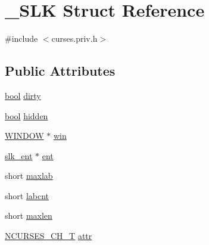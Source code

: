 \hypertarget{struct___s_l_k}{\section{\-\_\-\-S\-L\-K Struct Reference}
\label{struct___s_l_k}
}


{\ttfamily \#include $<$curses.\-priv.\-h$>$}

\subsection*{Public Attributes}
\begin{DoxyCompactItemize}
\item 
\hyperlink{term__entry_8h_a002004ba5d663f149f6c38064926abac}{bool} \hyperlink{struct___s_l_k_ace7f1360b4c1d1304e7a4aa6df2150e9}{dirty}
\item 
\hyperlink{term__entry_8h_a002004ba5d663f149f6c38064926abac}{bool} \hyperlink{struct___s_l_k_a17b05a989cd3d1c93d9ede62454e5aa0}{hidden}
\item 
\hyperlink{curses_8priv_8h_aa64cc90e7a4df667d6c7249b77890d39}{W\-I\-N\-D\-O\-W} $\ast$ \hyperlink{struct___s_l_k_aa4afb711773305bb8be9194a8315d0f0}{win}
\item 
\hyperlink{structslk__ent}{slk\-\_\-ent} $\ast$ \hyperlink{struct___s_l_k_a5858a4d5b56a4989140f5ce69173b975}{ent}
\item 
short \hyperlink{struct___s_l_k_a116fc4ed366a98270a12a48584c63424}{maxlab}
\item 
short \hyperlink{struct___s_l_k_ae8e80a48dcf542d50759059d4e0436e6}{labcnt}
\item 
short \hyperlink{struct___s_l_k_a41069f0cc83ebd79eda3e36f2ca657fd}{maxlen}
\item 
\hyperlink{curses_8priv_8h_a04df53f09b2555aa1f2cee78235c33cd}{N\-C\-U\-R\-S\-E\-S\-\_\-\-C\-H\-\_\-\-T} \hyperlink{struct___s_l_k_a3d2c6d41270edcd2650f8ab6a0515a50}{attr}
\end{DoxyCompactItemize}


